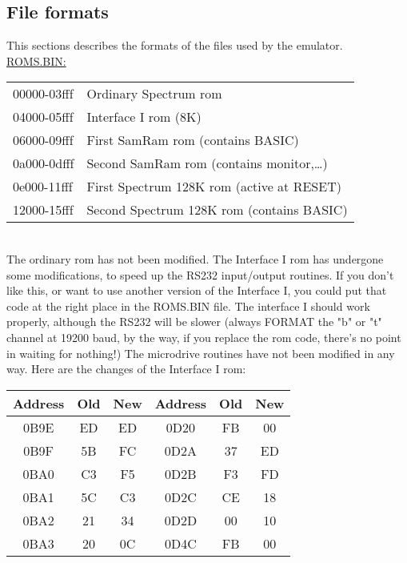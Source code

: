 \newpage
\subsection{File formats}

    This sections describes the formats of the files used by
    the emulator.\\

\noindent
\underline{ROMS.BIN:}\\

\begin{tabular}{ll}
        00000-03fff &    Ordinary Spectrum rom 				\\
        04000-05fff &    Interface I rom (8K)				\\
        06000-09fff &    First SamRam rom (contains BASIC)		\\
        0a000-0dfff &    Second SamRam rom (contains monitor,\ldots)   \\
        0e000-11fff &    First Spectrum 128K rom (active at RESET)	\\
        12000-15fff &    Second Spectrum 128K rom (contains BASIC)	\\
\end{tabular}\\

\noindent
    The ordinary rom has not been modified.  The Interface I rom has
    undergone some modifications, to speed up the RS232 input/output
    routines.  If you don't like this, or want to use another version of the
    Interface I, you could put that code at the right place in the ROMS.BIN
    file.  The interface I should work properly, although the RS232 will be
    slower (always FORMAT the "b" or "t" channel at 19200 baud, by the way,
    if you replace the rom code, there's no point in waiting for nothing!)
    The microdrive routines have not been modified in any way.  Here are the
    changes of the Interface I rom:\\

\begin{tabular}{|c|c|c||c|c|c|}
  \hline
   Address & Old & New     &     Address & Old & New\\
  \hline
  \hline
     0B9E  & ED  & ED      &       0D20  & FB  & 00\\
     0B9F  & 5B  & FC      &       0D2A  & 37  & ED\\
     0BA0  & C3  & F5      &       0D2B  & F3  & FD\\
     0BA1  & 5C  & C3      &       0D2C  & CE  & 18\\
     0BA2  & 21  & 34      &       0D2D  & 00  & 10\\
     0BA3  & 20  & 0C      &       0D4C  & FB  & 00\\
  \hline
\end{tabular}\\

